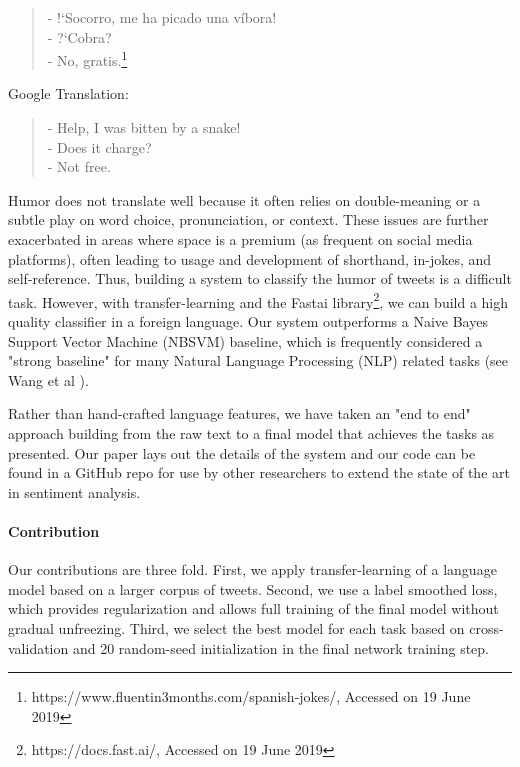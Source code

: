 \documentclass[runningheads]{llncs}
\begin{document}
\begin{quote}
- !`Socorro, me ha picado una víbora!\\
- ?`Cobra?\\
- No, gratis.\footnote{https://www.fluentin3months.com/spanish-jokes/, Accessed on 19 June 2019}
\end{quote}
Google Translation:
\begin{quote}
- Help, I was bitten by a snake!\\
- Does it charge?\\
- Not free.
\end{quote}
Humor does not translate well because it often relies on double-meaning or a subtle play on word choice, pronunciation, or context.  These issues are further exacerbated in areas where space is a premium (as frequent on social media platforms), often leading to usage and development of shorthand, in-jokes, and self-reference. Thus, building a system to classify the humor of tweets is a difficult task.  However, with transfer-learning and the Fastai library\footnote{https://docs.fast.ai/, Accessed on 19 June 2019}, we can build a high quality classifier in a foreign language. Our system outperforms a Naive Bayes Support Vector Machine (NBSVM) baseline, which is frequently considered a "strong baseline" for many Natural Language Processing (NLP) related tasks (see 
Wang et al \cite{Wang:2012:BBS:2390665.2390688}).

Rather than hand-crafted language features, we have taken an "end to end" approach building from the raw text to a final model that achieves the tasks as presented.  Our paper lays out the details of the system and our code can be found in a GitHub repo for use by other researchers to extend the state of the art in sentiment analysis. 

\paragraph{Contribution} Our contributions are three fold.  First, we apply transfer-learning of a language model based on a larger corpus of tweets.  Second, we use a label smoothed loss, which provides regularization and allows full training of the final model without gradual unfreezing.  Third, we select the best model for each task based on cross-validation and 20 random-seed initialization in the final network training step.
\end{document}
